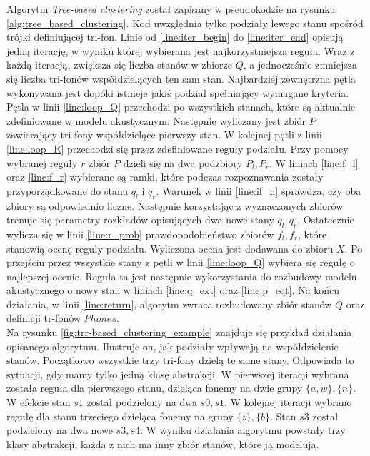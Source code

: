 \documentclass[shortabstract, mgr]{iithesis}
\begin{document}
	Algorytm \textit{Tree-based clustering} został zapisany w pseudokodzie na rysunku \ref{alg:tree_based_clustering}. Kod uwzględnia tylko podziały lewego stanu spośród trójki definiującej tri-fon. Linie od \ref{line:iter_begin} do \ref{line:iter_end} opisują jedną iterację, w wyniku której wybierana jest najkorzystniejsza reguła. Wraz z każdą iteracją, zwiększa się liczba stanów w zbiorze $Q$, a jednocześnie zmniejsza się liczba tri-fonów współdzielących ten sam stan. Najbardziej zewnętrzna pętla wykonywana jest dopóki istnieje jakiś  podział spełniający wymagane kryteria. Pętla w linii \ref{line:loop_Q} przechodzi po wszystkich stanach, które są aktualnie zdefiniowane w modelu akustycznym. Następnie wyliczany jest zbiór $P$ zawierający tri-fony współdzielące pierwszy stan. W kolejnej pętli z linii \ref{line:loop_R} przechodzi się przez zdefiniowane reguły podziału. Przy pomocy wybranej reguły $r$ zbiór $P$ dzieli się na dwa podzbiory $P_l, P_r$. W liniach \ref{line:f_l} oraz \ref{line:f_r} wybierane są ramki, które podczas rozpoznawania zostały przyporządkowane do stanu $q_l$ i $q_r$. Warunek w linii \ref{line:if_n} sprawdza, czy oba zbiory są odpowiednio liczne. Następnie korzystając z wyznaczonych zbiorów trenuje się parametry rozkładów opisujących dwa nowe stany $q_l, q_r$. Ostatecznie wylicza się w linii \ref{line:r_prob} prawdopodobieństwo zbiorów $f_l, f_r$, które stanowią ocenę reguły podziału. Wyliczona ocena jest dodawana do zbioru $X$. Po przejściu przez wszystkie stany z pętli w linii \ref{line:loop_Q} wybiera się regułę o najlepszej ocenie. Reguła ta jest następnie wykorzystania do rozbudowy modelu akustycznego o nowy stan w liniach \ref{line:q_ext} oraz \ref{line:p_eqt}. Na końcu działania, w linii \ref{line:return}, algorytm zwraca rozbudowany zbiór stanów $Q$ oraz definicji tr-fonów $Phones$.\\
	Na rysunku \ref{fig:trr-based_clustering_example} znajduje się przykład działania opisanego algorytmu. Ilustruje on, jak podziały wpływają na współdzielenie stanów. Początkowo wszystkie trzy tri-fony dzielą te same stany. Odpowiada to sytuacji, gdy mamy tylko jedną klasę abstrakcji. W pierwszej iteracji wybrana została reguła dla pierwszego stanu, dzieląca fonemy na dwie grupy $\{a,w\},\{n\}$. W efekcie stan $s1$ został podzielony na dwa $s0,s1$. W kolejnej iteracji wybrano regułę dla stanu trzeciego dzielącą fonemy na grupy $\{z\},\{b\}$. Stan $s3$ został podzielony na dwa nowe $s3,s4$. W wyniku działania algorytmu powstały trzy klasy abstrakcji, każda z nich ma inny zbiór stanów, które ją modelują. \\
\end{document}
